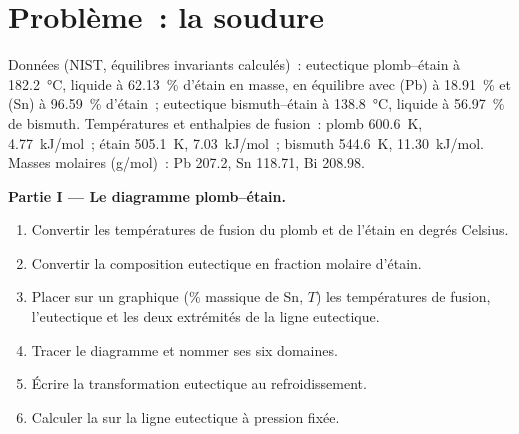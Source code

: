 \section{Problème~: la soudure}

\begin{problem}
\label{pb:b2:solid-liquid-diagrams:1}
Données (NIST, équilibres invariants calculés)~: eutectique plomb--étain à
\qty{182.2}{\degreeCelsius}, liquide à 62.13~\% d'étain en masse, en équilibre avec
(Pb) à 18.91~\% et (Sn) à 96.59~\% d'étain~; eutectique bismuth--étain à
\qty{138.8}{\degreeCelsius}, liquide à 56.97~\% de bismuth. Températures et
enthalpies de fusion~: plomb \qty{600.6}{K}, \qty{4.77}{kJ/mol}~; étain
\qty{505.1}{K}, \qty{7.03}{kJ/mol}~; bismuth \qty{544.6}{K}, \qty{11.30}{kJ/mol}.
Masses molaires (\unit{g/mol})~: Pb 207.2, Sn 118.71, Bi 208.98.

\medskip
\noindent\textbf{Partie I --- Le diagramme plomb--étain.}
\begin{enumerate}
  \item Convertir les températures de fusion du plomb et de l'étain en degrés Celsius.
  \item Convertir la composition eutectique en fraction molaire d'étain.
  \item Placer sur un graphique (\% massique de Sn, $T$) les températures de fusion, l'eutectique et
        les deux extrémités de la ligne eutectique.
  \item Tracer le diagramme et nommer ses six domaines.
  \item Écrire la transformation eutectique au refroidissement.
  \item Calculer la  sur la ligne eutectique à pression fixée.
\end{enumerate}


\end{problem}
